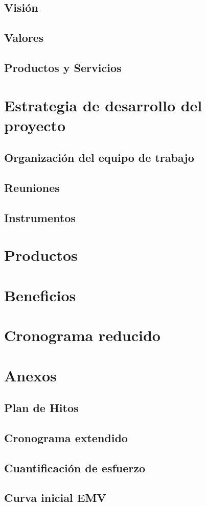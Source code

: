 \subsection{Visión}
\subsection{Valores}
\subsection{Productos y Servicios}
\section{Estrategia de desarrollo del proyecto}
\subsection{Organización del equipo de trabajo}
\subsection{Reuniones}
\subsection{Instrumentos}
\section{Productos}
\section{Beneficios}
\section{Cronograma reducido}
\section{Anexos}
\subsection{Plan de Hitos}
\subsection{Cronograma extendido}
\subsection{Cuantificación de esfuerzo}
\subsection{Curva inicial EMV}
